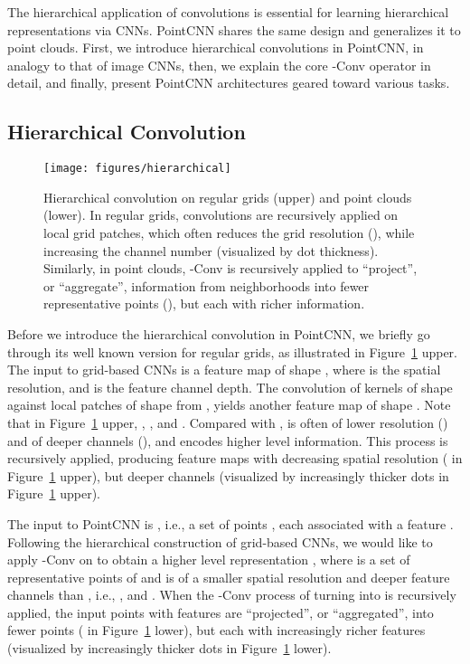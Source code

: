\documentclass{article}
\begin{document}
The hierarchical application of convolutions is essential for learning hierarchical representations via CNNs. PointCNN shares the same design and generalizes it to point clouds. First, we introduce hierarchical convolutions in PointCNN, in analogy to that of image CNNs, then, we explain the core -Conv operator in detail, and finally, present PointCNN architectures geared toward various tasks.

\subsection{Hierarchical Convolution}

\begin{figure}[h!]
  \begin{minipage}[c]{0.5\textwidth}
  \texttt{[image: figures/hierarchical]}
  \end{minipage}\hfill
  \begin{minipage}[c]{0.48\textwidth}
	\caption{Hierarchical convolution on regular grids (upper) and point clouds (lower). In regular grids, convolutions are recursively applied on local grid patches, which often reduces the grid resolution (), while increasing the channel number (visualized by dot thickness). Similarly, in point clouds, -Conv is recursively applied to ``project'', or ``aggregate'', information from neighborhoods into fewer representative points (), but each with richer information.}
	\label{fig:hierarchical}
  \end{minipage}
\end{figure}

Before we introduce the hierarchical convolution in PointCNN, we briefly go through
its well known version for regular grids, as illustrated in Figure~\ref{fig:hierarchical} upper. The input to grid-based CNNs is a feature map  of shape , where  is the spatial resolution, and  is the feature channel depth. The convolution of kernels  of shape  against local patches of shape  from , yields another feature map  of shape . Note that in Figure~\ref{fig:hierarchical} upper, , , and . Compared with ,  is often of lower resolution () and of deeper channels (), and encodes higher level information. This process is recursively applied, producing feature maps with decreasing spatial resolution ( in Figure~\ref{fig:hierarchical} upper), but deeper channels (visualized by increasingly thicker dots in Figure~\ref{fig:hierarchical} upper).

The input to PointCNN is , i.e., a set of points , each associated with a feature . Following the hierarchical construction of grid-based CNNs, we would like to apply -Conv on  to obtain a higher level representation , where  is a set of representative points of  and  is of a smaller spatial resolution and deeper feature channels than , i.e., , and . When the -Conv process of turning  into  is recursively applied, the input points with features are ``projected'', or ``aggregated'', into fewer points ( in Figure~\ref{fig:hierarchical} lower), but each with increasingly richer features (visualized by increasingly thicker dots in Figure~\ref{fig:hierarchical} lower).
\end{document}
